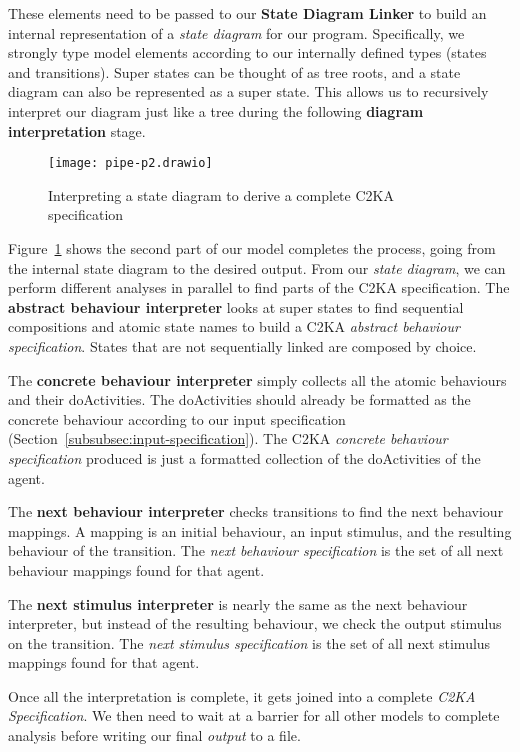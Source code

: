 These elements need to be passed to our \textbf{State Diagram Linker}
to build an internal representation of a \textit{state diagram} for our program.
Specifically, we strongly type model elements according to our internally defined types (states and transitions).
Super states can be thought of as tree roots, and a state diagram can also be represented as a super state.
This allows us to recursively interpret our diagram just like a tree during the following \textbf{diagram interpretation} stage.

\begin{figure}[ht]
    \centering
    \texttt{[image: pipe-p2.drawio]}
    \caption{Interpreting a state diagram to derive a complete C2KA specification}
    \label{fig:pipe-2}
\end{figure}

Figure~\ref{fig:pipe-2} shows the second part of our model completes the process, going from the internal state diagram to the desired output.
From our \textit{state diagram}, we can perform different analyses in parallel to find parts of the C2KA specification.
The \textbf{abstract behaviour interpreter} looks at super states to find sequential compositions
and atomic state names to build a C2KA \textit{abstract behaviour specification}.
States that are not sequentially linked are composed by choice.

The \textbf{concrete behaviour interpreter} simply collects all the atomic behaviours and their doActivities.
The doActivities should already be formatted as the concrete behaviour according to our input specification (Section~\ref{subsubsec:input-specification}).
The C2KA \textit{concrete behaviour specification} produced is just a formatted collection of the doActivities of the agent.

The \textbf{next behaviour interpreter} checks transitions to find the next behaviour mappings.
A mapping is an initial behaviour, an input stimulus, and the resulting behaviour of the transition.
The \textit{next behaviour specification} is the set of all next behaviour mappings found for that agent.

The \textbf{next stimulus interpreter} is nearly the same as the next behaviour interpreter,
but instead of the resulting behaviour, we check the output stimulus on the transition.
The \textit{next stimulus specification} is the set of all next stimulus mappings found for that agent.

Once all the interpretation is complete, it gets joined into a complete \textit{C2KA Specification}.
We then need to wait at a barrier for all other models to complete analysis before writing our final \textit{output} to a file.

